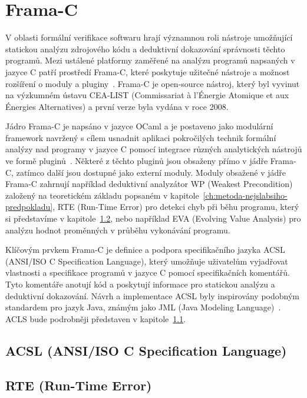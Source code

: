 \chapter{Frama-C}
\label{ch:frama-c}

V oblasti formální verifikace softwaru hrají významnou roli nástroje umožňující
statickou analýzu zdrojového kódu a deduktivní dokazování správnosti těchto programů.
Mezi ustálené platformy zaměřené na analýzu programů napsaných v jazyce C patří prostředí Frama-C,
které poskytuje užitečné nástroje a možnost rozšíření o moduly a pluginy~\cite{FCKernelMaroneze2024}.
Frama-C je open-source nástroj, který byl vyvinut na výzkumném ústavu CEA-LIST (Commissariat à l'Énergie Atomique et aux Énergies Alternatives)
a první verze byla vydána v roce 2008.

Jádro Frama-C je napsáno v jazyce OCaml a je postaveno jako modulární framework
navržený s cílem usnadnit aplikaci pokročilých technik formální analýzy nad programy v jazyce C
pomocí integrace různých analytických nástrojů ve formě pluginů~\cite{FCPluginDevSignoles2024}.
Některé z těchto pluginů jsou obsaženy přímo v jádře Frama-C, zatímco další jsou dostupné jako externí moduly.
Moduly obsažené v jádře Frama-C zahrnují například deduktivní analyzátor WP (Weakest Precondition)
založený na teoretickém základu popsaném v kapitole~\ref{ch:metoda-nejslabsiho-predpokladu},
RTE (Run-Time Error) pro detekci chyb při běhu programu, který si představíme v kapitole~\ref{sec:frama-c-rte},
nebo například EVA (Evolving Value Analysis) pro analýzu hodnot proměnných v průběhu vykonávání programu.

Klíčovým prvkem Frama-C je definice a podpora specifikačního jazyka ACSL (ANSI/ISO C Specification Language),
který umožňuje uživatelům vyjadřovat vlastnosti a specifikace programů v jazyce C pomocí specifikačních komentářů.
Tyto komentáře anotují kód a poskytují informace pro statickou analýzu a deduktivní dokazování.
Návrh a implementace ACSL byly inspirovány podobným standardem pro jazyk Java, známým jako JML (Java Modeling Language)~\cite{ACSLSpec}.
ACLS bude podrobněji představen v kapitole~\ref{sec:acsl}.

\section{ACSL (ANSI/ISO C Specification Language)}
\label{sec:acsl}


\section{RTE (Run-Time Error)}
\label{sec:frama-c-rte}


